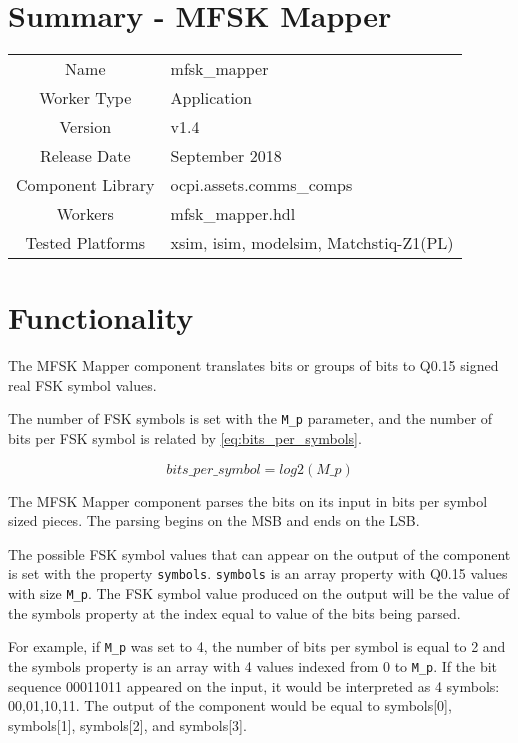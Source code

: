 \documentclass{article}
\author{} %
\date{Version \docVersion} %
\title{\docTitle}
\def\docVersion{1.4}
\def\comp{mfsk\_mapper}
\def\Comp{MFSK Mapper}
\begin{document}
\section*{Summary - \Comp}
\begin{tabular}{|c|M{13.5cm}|}
	\hline
	                  &                        	\\
	\hline
	Name              & \comp                  	\\
	\hline
	Worker Type       & Application            	\\
	\hline
	Version           & v\docVersion           	\\
	\hline
	Release Date      & September 2018           	\\
	\hline
	Component Library & ocpi.assets.comms\_comps	\\
	\hline
	Workers           & \comp.hdl              	\\
	\hline
	Tested Platforms  & xsim, isim, modelsim, Matchstiq-Z1(PL) \\
	\hline
\end{tabular}

\section*{Functionality}
\begin{flushleft}
	The \Comp{} component translates bits or groups of bits to Q0.15 signed real FSK symbol values.\medskip

	The number of FSK symbols is set with the \verb+M_p+ parameter, and the number of bits per FSK symbol is related by \ref{eq:bits_per_symbols}.

	\begin{equation} \label{eq:bits_per_symbols}
  		bits\_per\_symbol = log2(M\_p)
	\end{equation}

	The \Comp{} component parses the bits on its input in bits per symbol sized pieces. The parsing begins on the MSB and ends on the LSB.\medskip

	The possible FSK symbol values that can appear on the output of the component is set with the property \verb+symbols+. \verb+symbols+ is an array property with Q0.15 values with size \verb+M_p+. The FSK symbol value produced on the output will be the value of the symbols property at the index equal to value of the bits being parsed.\medskip

	For example, if \verb+M_p+ was set to 4, the number of bits per symbol is equal to 2 and the symbols property is an array with 4 values indexed from 0 to \verb+M_p+. If the bit sequence 00011011 appeared on the input, it would be interpreted as 4 symbols: 00,01,10,11. The output of the component would be equal to symbols[0], symbols[1], symbols[2], and symbols[3].\medskip

\end{flushleft}
\end{document}
